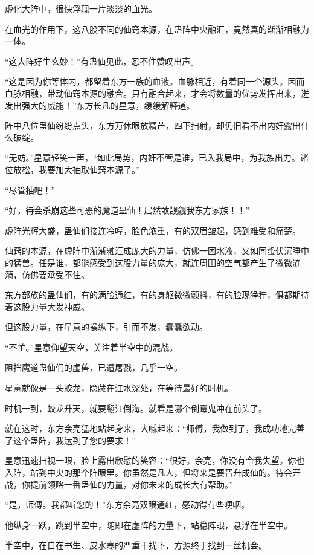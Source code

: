 \begin{this_body}
虚化大阵中，很快浮现一片淡淡的血光。

在血光的作用下，这八股不同的仙窍本源，在蛊阵中央融汇，竟然真的渐渐相融为一体。

“这大阵好生玄妙！”有蛊仙见此，忍不住赞叹出声。

“这是因为你等体内，都留着东方一族的血液。血脉相近，有着同一个源头。因而血脉相融，带动仙窍本源的融合。只有融合起来，才会将数量的优势发挥出来，迸发出强大的威能！”东方长凡的星意，缓缓解释道。

阵中八位蛊仙纷纷点头，东方万休眼放精芒，四下扫射，却仍旧看不出内奸露出什么破绽。

“无妨。”星意轻笑一声，“如此局势，内奸不管是谁，已入我局中，为我族出力。诸位放松，我要加大抽取仙窍本源了。”

“尽管抽吧！”

“好，待会杀崩这些可恶的魔道蛊仙！居然敢觊觎我东方家族！！”

虚阵光辉大盛，蛊仙们接连冷哼，脸色浓重，有的双眉皱起，感到难受和痛楚。

仙窍的本源，在虚阵中渐渐融汇成庞大的力量，仿佛一团水液，又如同蛰伏沉睡中的猛兽。任是谁，都能感受到这股力量的庞大，就连周围的空气都产生了微微涟漪，仿佛要承受不住。

东方部族的蛊仙们，有的满脸通红，有的身躯微微颤抖，有的脸现狰狞，俱都期待着这股力量大发神威。

但这股力量，在星意的操纵下，引而不发，蠢蠢欲动。

“不忙。”星意仰望天空，关注着半空中的混战。

阻挡魔道蛊仙们的虚兽，已遭屠戮，几乎一空。

星意就像是一头蛟龙，隐藏在江水深处，在等待最好的时机。

时机一到，蛟龙升天，就要翻江倒海。就看是哪个倒霉鬼冲在前头了。

就在这时，东方余亮猛地站起身来，大喊起来：“师傅，我做到了，我成功地完善了这个蛊阵，我达到了您的要求！”

星意迅速扫视一眼，脸上露出欣慰的笑容：“很好。余亮，你没有令我失望。你也入阵，站到中央的那个阵眼里。你虽然是凡人，但将来是要晋升成仙的。待会开战，你提前领略一番蛊仙的力量，对你未来的成长大有帮助。”

“是，师傅。我都听您的！”东方余亮双眼通红，感动得有些哽咽。

他纵身一跃，跳到半空中，随即在虚阵的力量下，站稳阵眼，悬浮在半空中。

半空中，在自在书生、皮水寒的严重干扰下，方源终于找到一丝机会。


\end{this_body}
